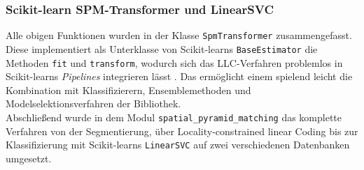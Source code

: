 \subsubsection{Scikit-learn SPM-Transformer und LinearSVC}

Alle obigen Funktionen wurden in der Klasse \texttt{SpmTransformer} zusammengefasst. Diese implementiert als Unterklasse von Scikit-learns \texttt{BaseEstimator} die Methoden \texttt{fit} und \texttt{transform}, wodurch sich das LLC-Verfahren problemlos in Scikit-learns \emph{Pipelines} integrieren lässt \cite{sklearn}. Das ermöglicht einem spielend leicht die Kombination mit Klassifizierern, Ensemblemethoden und Modelselektionsverfahren der Bibliothek. \\
Abschließend wurde in dem Modul \texttt{spatial\_pyramid\_matching} das komplette Verfahren von der Segmentierung, über Locality-constrained linear Coding bis zur Klassifizierung mit Scikit-learns \texttt{LinearSVC} auf zwei verschiedenen Datenbanken umgesetzt.